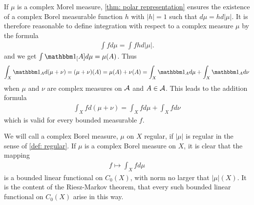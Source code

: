 If $\mu$ is a complex Morel measure, \cref{thm: polar representation} ensures the existence of a complex Borel measurable function $h$ with $|h|=1$ such that $d\mu=hd|\mu|$. It is therefore reasonable to define integration with respect to a complex measure $\mu$ by the formula
\begin{align*}
	\int fd\mu=\int fhd|\mu|.
\end{align*}
and we get $\int \ind[A] d\mu=\mu(A)$. Thus
\begin{align*}
	\int_{X}\ind{A} d(\mu+\nu)=(\mu+\nu)(A)=\mu(A)+\nu(A)=\int_{X}\ind{A}d\mu+\int_{X} \ind{A} d\nu
\end{align*}
when $\mu$ and $\nu$ are complex measures on $\mathcal{A}$ and $A\in \mathcal{A}$. This leads to the addition formula
\begin{align*}
	\int_{X} fd(\mu+\nu)=\int_{X}fd\mu+\int_{X}fd\nu
\end{align*}
which is valid for every bounded measurable $f$.

We will call a complex Borel measure, $\mu$ on $X$ regular, if $|\mu|$ is regular in the sense of \cref{def: regular}. If $\mu$ is a complex Borel measure on $X$, it is clear that the mapping
\begin{align*}
	f\mapsto \int_{X}fd\mu
\end{align*}
is a bounded linear functional on $C_{0}(X)$, with norm no larger that $|\mu|(X)$.
It is the content of the Riesz-Markov theorem, that every such bounded linear functional on $C_{0}(X)$ arise in this way.



